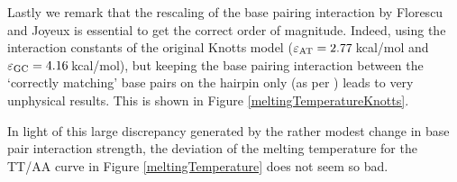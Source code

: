 Lastly we remark that the rescaling of the base pairing interaction by Florescu and Joyeux is essential to get the correct order of magnitude.
Indeed, using the interaction constants of the original Knotts model ($\varepsilon_\text{AT} = 2.77$\,kcal/mol and $\varepsilon_\text{GC} = 4.16$\,kcal/mol), but keeping the base pairing interaction between the `correctly matching' base pairs on the hairpin only (as per \cite{florescu2011thermal}) leads to very unphysical results. This is shown in Figure \ref{meltingTemperatureKnotts}. 

In light of this large discrepancy generated by the rather modest change in base pair interaction strength, the deviation of the melting temperature for the TT/AA curve in Figure \ref{meltingTemperature} does not seem so bad.


